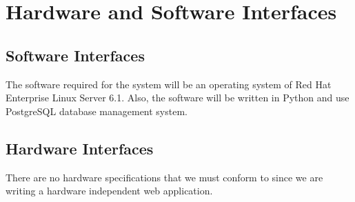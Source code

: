 \section{Hardware and Software Interfaces}
\subsection{Software Interfaces}
The software required for the system will be an operating system of Red Hat Enterprise Linux Server 6.1.  Also, the software will be written in Python and use PostgreSQL database management system.

\subsection{Hardware Interfaces}
There are no hardware specifications that we must conform to since we are writing a hardware independent web application.